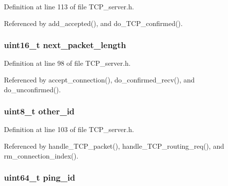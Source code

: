 Definition at line 113 of file T\+C\+P\+\_\+server.\+h.



Referenced by add\+\_\+accepted(), and do\+\_\+\+T\+C\+P\+\_\+confirmed().

\hypertarget{struct_t_c_p___secure___connection_a1d1e3047af3c935db36ae7b2360aaec7}{
\subsubsection[{next\+\_\+packet\+\_\+length}]{\setlength{\rightskip}{0pt plus 5cm}uint16\+\_\+t next\+\_\+packet\+\_\+length}}\label{struct_t_c_p___secure___connection_a1d1e3047af3c935db36ae7b2360aaec7}


Definition at line 98 of file T\+C\+P\+\_\+server.\+h.



Referenced by accept\+\_\+connection(), do\+\_\+confirmed\+\_\+recv(), and do\+\_\+unconfirmed().

\hypertarget{struct_t_c_p___secure___connection_acc644a8b29d76cc8fb3a5bdfcaa2bfe1}{
\subsubsection[{other\+\_\+id}]{\setlength{\rightskip}{0pt plus 5cm}uint8\+\_\+t other\+\_\+id}}\label{struct_t_c_p___secure___connection_acc644a8b29d76cc8fb3a5bdfcaa2bfe1}


Definition at line 103 of file T\+C\+P\+\_\+server.\+h.



Referenced by handle\+\_\+\+T\+C\+P\+\_\+packet(), handle\+\_\+\+T\+C\+P\+\_\+routing\+\_\+req(), and rm\+\_\+connection\+\_\+index().

\hypertarget{struct_t_c_p___secure___connection_acec02fbdff648ca71a6d8e5a0d63d634}{
\subsubsection[{ping\+\_\+id}]{\setlength{\rightskip}{0pt plus 5cm}uint64\+\_\+t ping\+\_\+id}}\label{struct_t_c_p___secure___connection_acec02fbdff648ca71a6d8e5a0d63d634}


